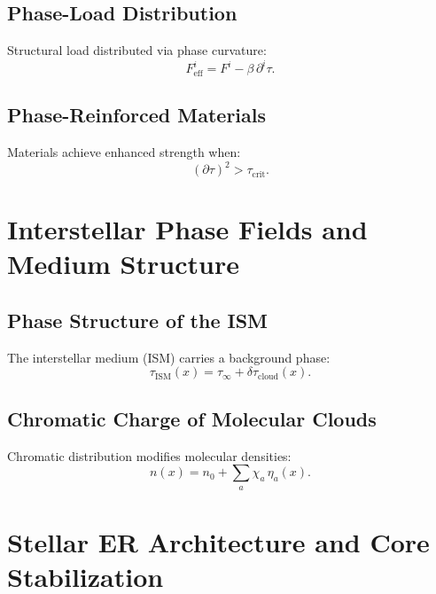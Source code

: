\section{Phase-Load Distribution}
Structural load distributed via phase curvature:
\[
F^i_{\mathrm{eff}} = F^i - \beta\,\partial^i\tau.
\]

\section{Phase-Reinforced Materials}
Materials achieve enhanced strength when:
\[
(\partial\tau)^2 > \tau_{\mathrm{crit}}.
\]



\chapter{Interstellar Phase Fields and Medium Structure}

\section{Phase Structure of the ISM}
The interstellar medium (ISM) carries a background phase:
\[
\tau_{\mathrm{ISM}}(x) = \tau_\infty + \delta\tau_{\mathrm{cloud}}(x).
\]

\section{Chromatic Charge of Molecular Clouds}
Chromatic distribution modifies molecular densities:
\[
n(x) = n_0 + \sum_a \chi_a\,\eta_a(x).
\]



\chapter{Stellar ER Architecture and Core Stabilization}

